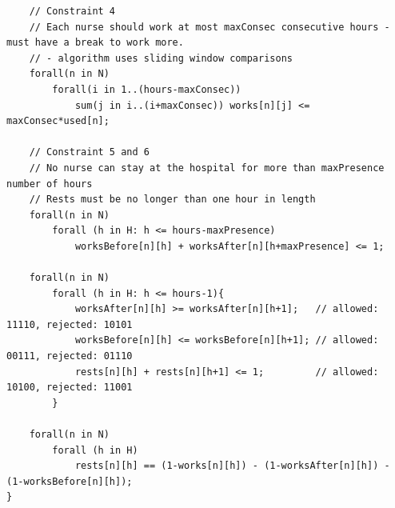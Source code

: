 \documentclass[11pt]{article}
\begin{document}
\begin{appendix}
{\begin{lstlisting}
	// Constraint 4
	// Each nurse should work at most maxConsec consecutive hours - must have a break to work more.
	// - algorithm uses sliding window comparisons
	forall(n in N)
		forall(i in 1..(hours-maxConsec))
			sum(j in i..(i+maxConsec)) works[n][j] <= maxConsec*used[n];

	// Constraint 5 and 6
	// No nurse can stay at the hospital for more than maxPresence number of hours
	// Rests must be no longer than one hour in length
	forall(n in N)
		forall (h in H: h <= hours-maxPresence)
			worksBefore[n][h] + worksAfter[n][h+maxPresence] <= 1;
	
	forall(n in N)
		forall (h in H: h <= hours-1){
			worksAfter[n][h] >= worksAfter[n][h+1];   // allowed: 11110, rejected: 10101
			worksBefore[n][h] <= worksBefore[n][h+1]; // allowed: 00111, rejected: 01110
			rests[n][h] + rests[n][h+1] <= 1;         // allowed: 10100, rejected: 11001
		}

	forall(n in N)
		forall (h in H)
			rests[n][h] == (1-works[n][h]) - (1-worksAfter[n][h]) - (1-worksBefore[n][h]); 
}

\end{lstlisting}}

\end{appendix}
\end{document}
